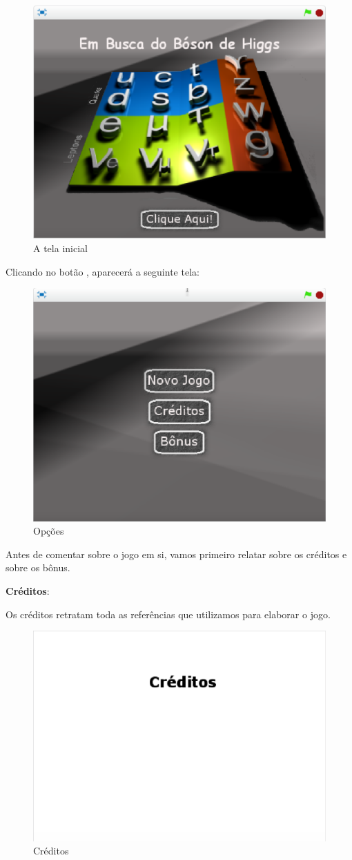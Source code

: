 \documentclass[12pt,fleqn]{book} %
\begin{document}
\begin{figure}[h]
	\centering
	\includegraphics[width=0.65 \textwidth]{Produto/tela_inicial}
	\caption{A tela inicial}
	\label{fig:app_a:telainicial}
\end{figure}

\newpage

Clicando no botão , aparecerá a seguinte tela:

\begin{figure}[h]
	\centering
	\includegraphics[width=0.65 \textwidth]{Produto/options}
	\caption{Opções}
	\label{fig:app_a:options}
\end{figure}


Antes de comentar sobre o jogo em si, vamos primeiro relatar sobre os créditos e sobre os bônus.

\textbf{Créditos}:

Os créditos retratam toda as referências que utilizamos para elaborar o jogo.

\begin{figure}[h]
	\centering
	\includegraphics[width=0.65 \textwidth]{Produto/credits}
	\caption{Créditos}
	\label{fig:app_a:credits}
\end{figure}
\end{document}
